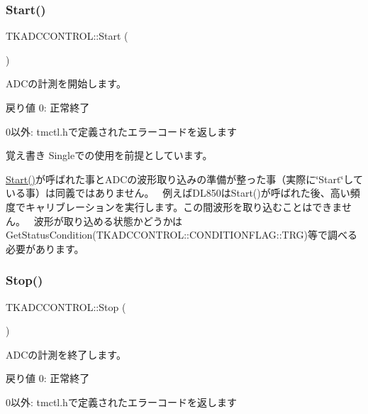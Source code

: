 \subsubsection{\texorpdfstring{Start()}{Start()}}
{\footnotesize\ttfamily T\+K\+A\+D\+C\+C\+O\+N\+T\+R\+O\+L\+::\+Start (\begin{DoxyParamCaption}{ }\end{DoxyParamCaption})}

A\+D\+Cの計測を開始します。 \begin{DoxyReturn}{戻り値}
0\+: 正常終了 

0以外\+: tmctl.\+hで定義されたエラーコードを返します 
\end{DoxyReturn}
\begin{DoxyNote}{覚え書き}
Singleでの使用を前提としています。 

\hyperlink{class_t_k_a_d_c_c_o_n_t_r_o_l_afd243c443ca134193acc8a409368aaf3}{Start()}が呼ばれた事と\+A\+D\+Cの波形取り込みの準備が整った事（実際に\char`\"{}\+Start\char`\"{}している事）は同義ではありません。~\newline
 例えば\+D\+L850は\+Start()が呼ばれた後、高い頻度でキャリブレーションを実行します。この間波形を取り込むことはできません。~\newline
 波形が取り込める状態かどうかは\+Get\+Status\+Condition(\+T\+K\+A\+D\+C\+C\+O\+N\+T\+R\+O\+L\+::\+C\+O\+N\+D\+I\+T\+I\+O\+N\+F\+L\+A\+G\+::\+T\+R\+G)等で調べる必要があります。 
\end{DoxyNote}
\mbox{\label{class_t_k_a_d_c_c_o_n_t_r_o_l_a3fc45766f6e7f770280f0e165827f86a}} 
\subsubsection{\texorpdfstring{Stop()}{Stop()}}
{\footnotesize\ttfamily T\+K\+A\+D\+C\+C\+O\+N\+T\+R\+O\+L\+::\+Stop (\begin{DoxyParamCaption}{ }\end{DoxyParamCaption})}

A\+D\+Cの計測を終了します。 \begin{DoxyReturn}{戻り値}
0\+: 正常終了 

0以外\+: tmctl.\+hで定義されたエラーコードを返します 
\end{DoxyReturn}
\mbox{\label{class_t_k_a_d_c_c_o_n_t_r_o_l_a7d6629217b6f034b9b546f88603d7f58}} 
